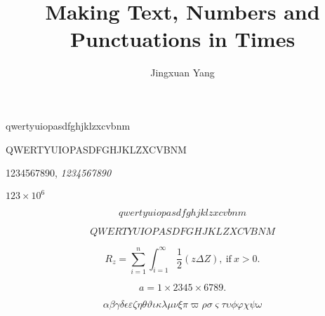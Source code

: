 \documentclass{article}
\title{Making Text, Numbers and Punctuations in Times}
\author{Jingxuan Yang}
\begin{document}
\maketitle

qwertyuiopasdfghjklzxcvbnm

QWERTYUIOPASDFGHJKLZXCVBNM

1234567890, \textit{1234567890}

$123\times10^6$

\begin{equation}
  qwertyuiopasdfghjklzxcvbnm
\end{equation}

\begin{equation}
  QWERTYUIOPASDFGHJKLZXCVBNM
\end{equation}

\begin{equation} 
R_{z} =\sum_{i=1}^n\int_{i=1}^\infty \frac12 (z \Delta Z),~\text{if}~x>0.
\end{equation}

\begin{equation}
  a=1\times2345\times6789.
\end{equation}

\begin{equation}
  \alpha\beta\gamma\delta\epsilon\varepsilon
\zeta\eta\theta\vartheta\iota\kappa\lambda\mu\nu\xi\pi\varpi
\rho\sigma\varsigma\tau\upsilon\phi\varphi\chi\psi\omega
\end{equation}
\end{document}
